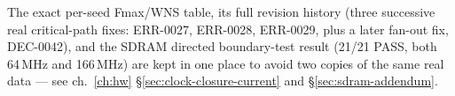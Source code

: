 \begin{fnnote}
The exact per-seed Fmax/WNS table, its full revision history (three
successive real critical-path fixes: ERR-0027, ERR-0028, ERR-0029, plus
a later fan-out fix, DEC-0042), and the SDRAM directed boundary-test
result (21/21 PASS, both 64\,MHz and 166\,MHz) are kept in one place to
avoid two copies of the same real data --- see ch.~\ref{ch:hw}
\S\ref{sec:clock-closure-current} and \S\ref{sec:sdram-addendum}.
\end{fnnote}
